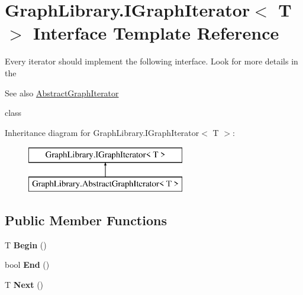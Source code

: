 \hypertarget{interface_graph_library_1_1_i_graph_iterator}{}\section{Graph\+Library.\+I\+Graph\+Iterator$<$ T $>$ Interface Template Reference}
\label{interface_graph_library_1_1_i_graph_iterator}


Every iterator should implement the following interface. Look for more details in the \begin{DoxySeeAlso}{See also}
\hyperlink{class_graph_library_1_1_abstract_graph_iterator}{Abstract\+Graph\+Iterator}


\end{DoxySeeAlso}
class  


Inheritance diagram for Graph\+Library.\+I\+Graph\+Iterator$<$ T $>$\+:\begin{figure}[H]
\begin{center}
\leavevmode
\includegraphics[height=2.000000cm]{interface_graph_library_1_1_i_graph_iterator}
\end{center}
\end{figure}
\subsection*{Public Member Functions}
\begin{DoxyCompactItemize}
\item 
\hypertarget{interface_graph_library_1_1_i_graph_iterator_a85320f1e30a1e0e75fcfe8cc4bbf3222}{}T {\bfseries Begin} ()\label{interface_graph_library_1_1_i_graph_iterator_a85320f1e30a1e0e75fcfe8cc4bbf3222}

\item 
\hypertarget{interface_graph_library_1_1_i_graph_iterator_abd32324aa52ab2d841f0c9362a0245d2}{}bool {\bfseries End} ()\label{interface_graph_library_1_1_i_graph_iterator_abd32324aa52ab2d841f0c9362a0245d2}

\item 
\hypertarget{interface_graph_library_1_1_i_graph_iterator_a2356105f82323620a4b143e4ddb1b331}{}T {\bfseries Next} ()\label{interface_graph_library_1_1_i_graph_iterator_a2356105f82323620a4b143e4ddb1b331}

\end{DoxyCompactItemize}


